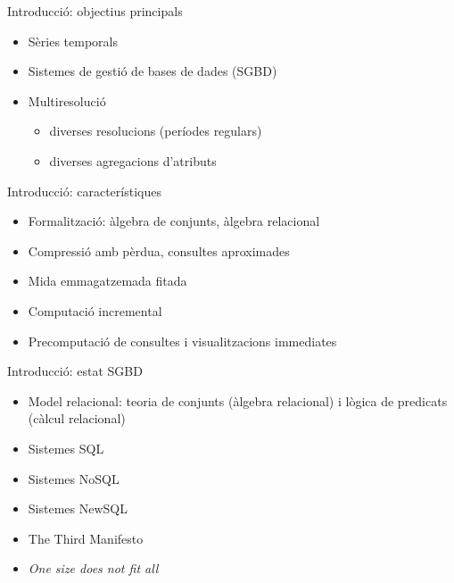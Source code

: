 
\begin{frame}{Introducció: objectius principals}

  \begin{itemize}
  \item Sèries temporals
  \item Sistemes de gestió de bases de dades (SGBD)
  \item Multiresolució
    \begin{itemize}
    \item diverses resolucions (períodes regulars)
    \item diverses agregacions d'atributs 
    \end{itemize}
  \end{itemize} 

\end{frame}


\begin{frame}{Introducció: característiques}

  \begin{itemize}
  \item Formalització: àlgebra de conjunts, àlgebra relacional
  \item Compressió amb pèrdua, consultes aproximades
  \item Mida emmagatzemada fitada
  \item Computació incremental
  \item Precomputació de consultes i visualitzacions immediates
  \end{itemize}

\end{frame}

\begin{frame}{Introducció: estat SGBD}

  \begin{itemize}
  \item Model relacional: teoria de conjunts (àlgebra relacional) i lògica de predicats (càlcul relacional)
  \item Sistemes SQL
  \item Sistemes NoSQL
  \item Sistemes NewSQL
  \item The Third Manifesto 
  \item \emph{One size does not fit all} \parencite{stonebraker09}
  \end{itemize}

\end{frame}


